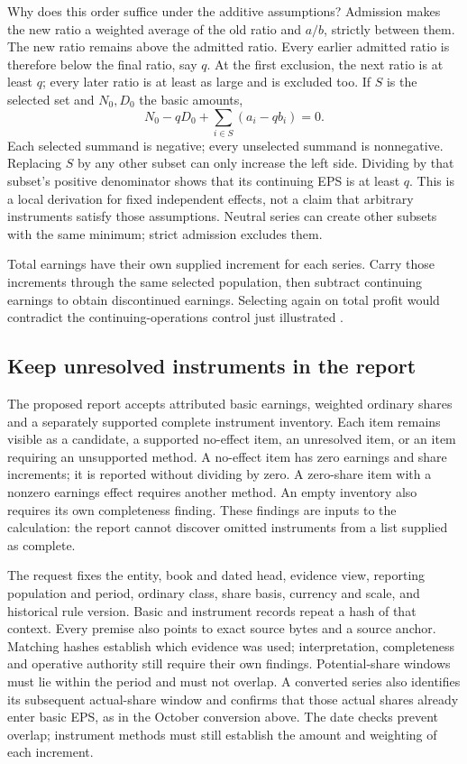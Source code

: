 Why does this order suffice under the additive assumptions? Admission makes
the new ratio a weighted average of the old ratio and $a/b$, strictly between
them. The new ratio remains above the admitted ratio. Every earlier admitted
ratio is therefore below the final ratio, say $q$. At the first exclusion,
the next ratio is at least $q$; every later ratio is at least as large and
is excluded too. If $S$ is the selected set and $N_0,D_0$ the basic amounts,
\[
 N_0-qD_0+\sum_{i\in S}(a_i-qb_i)=0.
\]
Each selected summand is negative; every unselected summand is nonnegative.
Replacing $S$ by any other subset can only increase the left side. Dividing
by that subset's positive denominator shows that its continuing EPS is at
least $q$. This is a local derivation for fixed independent effects, not a
claim that arbitrary instruments satisfy those assumptions. Neutral series
can create other subsets with the same minimum; strict admission excludes them.

Total earnings have their own supplied increment for each series. Carry
those increments through the same selected population, then subtract
continuing earnings to obtain discontinued earnings. Selecting again on
total profit would contradict the continuing-operations control just
illustrated \citep[IAS~33, paragraph A3]{eu20231803}.

\subsection{Keep unresolved instruments in the report}
\label{sec:ordered-eps-report}

The proposed  report accepts attributed basic earnings,
weighted ordinary shares and a separately supported complete instrument
inventory. Each item remains visible as a candidate, a supported no-effect
item, an unresolved item, or an item requiring an unsupported method.
A no-effect item has zero earnings and share increments; it is reported
without dividing by zero. A zero-share item with a nonzero earnings effect
requires another method. An empty inventory also requires its own completeness
finding. These findings are inputs to the calculation: the report cannot
discover omitted instruments from a list supplied as complete.

The request fixes the entity, book and dated head, evidence view, reporting
population and period, ordinary class, share basis, currency and scale, and
historical rule version. Basic and instrument records repeat a hash of that
context. Every premise also points to exact source bytes and a source anchor.
Matching hashes establish which evidence was used; interpretation, completeness
and operative authority still require their own findings. Potential-share
windows must lie within the period and must not overlap. A converted series
also identifies its subsequent actual-share window and confirms that those
actual shares already enter basic EPS, as in the October conversion above.
The date checks prevent overlap; instrument methods must still establish the
amount and weighting of each increment.

